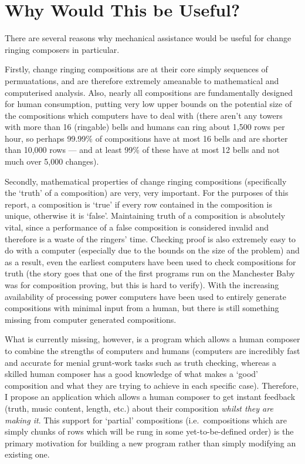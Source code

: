 \documentclass[12pt]{article}
\begin{document}
\section{Why Would This be Useful?}

There are several reasons why mechanical assistance would be useful for change ringing composers in
particular.

Firstly, change ringing compositions are at their core simply sequences of permuatations, and are
therefore extremely ameanable to mathematical and computerised analysis.  Also, nearly all
compositions are fundamentally designed for human consumption, putting very low upper bounds on the
potential size of the compositions which computers have to deal with (there aren't any towers with
more than 16 (ringable) bells and humans can ring about 1,500 rows per hour, so perhaps 99.99\% of
compositions have at most 16 bells and are shorter than 10,000 rows --- and at least 99\% of these
have at most 12 bells and not much over 5,000 changes).

Secondly, mathematical properties of change ringing compositions (specifically the `truth' of a
composition) are very, very important.  For the purposes of this report, a composition is `true' if
every row contained in the composition is unique, otherwise it is `false'.  Maintaining truth of a
composition is absolutely vital, since a performance of a false composition is considered invalid
and therefore is a waste of the ringers' time.  Checking proof is also extremely easy to do with a
computer (especially due to the bounds on the size of the problem) and as a result, even the
earliest computers have been used to check compositions for truth (the story goes that one of the
first programs run on the Manchester Baby was for composition proving, but this is hard to verify).
With the increasing availability of processing power computers have been used to entirely generate
compositions with minimal input from a human, but there is still something missing from computer
generated compositions.

What is currently missing, however, is a program which allows a human composer to combine the
strengths of computers and humans (computers are incredibly fast and accurate for menial grunt-work
tasks such as truth checking, whereas a skilled human composer has a good knowledge of what makes a
`good' composition and what they are trying to achieve in each specific case).  Therefore, I propose
an application which allows a human composer to get instant feedback (truth, music content, length,
etc.) about their composition \emph{whilst they are making it}.  This support for `partial'
compositions (i.e.\ compositions which are simply chunks of rows which will be rung in some
yet-to-be-defined order) is the primary motivation for building a new program rather than simply
modifying an existing one.
\end{document}
